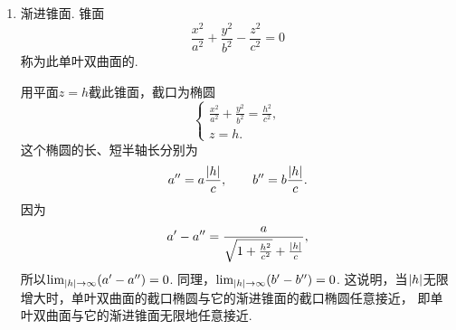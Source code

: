\begin{enumerate}
	\item 渐进锥面.
	锥面\begin{equation}
		\frac{x^2}{a^2}+\frac{y^2}{b^2}-\frac{z^2}{c^2}=0
	\end{equation}
	称为此单叶双曲面的.

	用平面\(z=h\)截此锥面，截口为椭圆\begin{equation*}
		\left\{ \begin{array}{l}
			\frac{x^2}{a^2}+\frac{y^2}{b^2}=\frac{h^2}{c^2}, \\
			z = h.
		\end{array} \right.
	\end{equation*}
	这个椭圆的长、短半轴长分别为\begin{equation*}
		a'' = a \frac{\abs{h}}{c}, \qquad
		b'' = b \frac{\abs{h}}{c}.
	\end{equation*}
	因为\begin{equation*}
		a' - a'' = \frac{a}{\sqrt{1+\frac{h^2}{c^2}}+\frac{\abs{h}}{c}},
	\end{equation*}
	所以\(\lim_{\abs{h}\to\infty}(a'-a'')=0\).
	同理，\(\lim_{\abs{h}\to\infty}(b'-b'')=0\).
	这说明，当\(\abs{h}\)无限增大时，单叶双曲面的截口椭圆与它的渐进锥面的截口椭圆任意接近，
	即单叶双曲面与它的渐进锥面无限地任意接近.
\end{enumerate}

